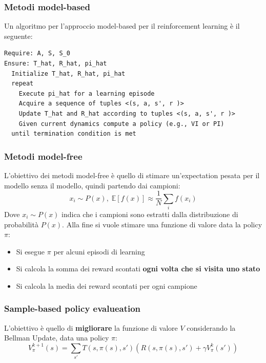 \documentclass[a4paper]{article}
\begin{document}
\subsubsection{Metodi model-based}
Un algoritmo per l'approccio model-based per il reinforcement learning è il seguente:
\begin{lstlisting}
Require: A, S, S_0
Ensure: T_hat, R_hat, pi_hat
  Initialize T_hat, R_hat, pi_hat
  repeat
    Execute pi_hat for a learning episode
    Acquire a sequence of tuples <(s, a, s', r )>
    Update T_hat and R_hat according to tuples <(s, a, s', r )>
    Given current dynamics compute a policy (e.g., VI or PI)
  until termination condition is met
\end{lstlisting}

\subsubsection{Metodi model-free}
L'obiettivo dei metodi model-free è quello di stimare un'expectation pesata
per il modello senza il modello, quindi partendo dai campioni:
\[
  x_i \sim P(x),\; \mathbb{E}[f(x)] \approx \frac{1}{N} \sum_{i} f(x_i)
\] 
Dove \( x_i \sim P(x) \) indica che i campioni sono estratti dalla distribuzione
di probabilità \( P(x) \). Alla fine si vuole stimare una funzione di valore
data la policy \( \pi \):
\begin{itemize}
  \item Si esegue \( \pi \) per alcuni episodi di learning
  \item Si calcola la somma dei reward scontati \textbf{ogni volta che si visita uno stato}
  \item Si calcola la media dei reward scontati per ogni campione
\end{itemize}

\subsubsection{Sample-based policy evalueation}
L'obiettivo è quello di \textbf{migliorare} la funzione di valore \( V \) considerando
la Bellman Update, data una policy \( \pi  \):
\[
  V_{\pi}^{k+1}(s) = \sum_{s'} T(s, \pi(s), s') \left( R(s, \pi(s), s') + \gamma V_{\pi}^{k}(s') \right)
\] 
\end{document}
